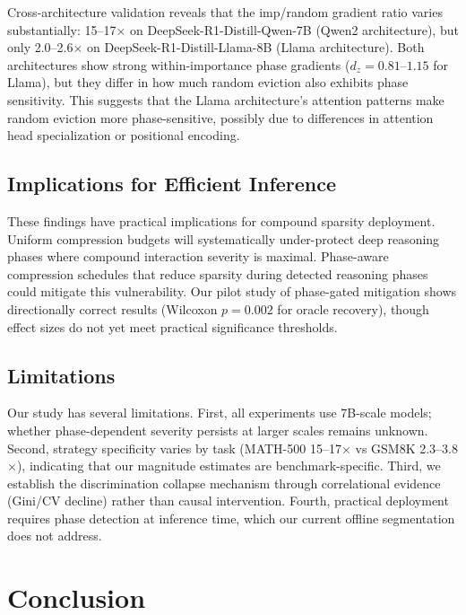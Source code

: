\documentclass[11pt,a4paper]{article}
\begin{document}
Cross-architecture validation reveals that the imp/random gradient ratio varies substantially: 15--17$\times$ on DeepSeek-R1-Distill-Qwen-7B (Qwen2 architecture), but only 2.0--2.6$\times$ on DeepSeek-R1-Distill-Llama-8B (Llama architecture). Both architectures show strong within-importance phase gradients ($d_z = 0.81$--$1.15$ for Llama), but they differ in how much random eviction also exhibits phase sensitivity. This suggests that the Llama architecture's attention patterns make random eviction more phase-sensitive, possibly due to differences in attention head specialization or positional encoding.

\subsection{Implications for Efficient Inference}

These findings have practical implications for compound sparsity deployment. Uniform compression budgets will systematically under-protect deep reasoning phases where compound interaction severity is maximal. Phase-aware compression schedules that reduce sparsity during detected reasoning phases could mitigate this vulnerability. Our pilot study of phase-gated mitigation shows directionally correct results (Wilcoxon $p = 0.002$ for oracle recovery), though effect sizes do not yet meet practical significance thresholds.

\subsection{Limitations}

Our study has several limitations. First, all experiments use 7B-scale models; whether phase-dependent severity persists at larger scales remains unknown. Second, strategy specificity varies by task (MATH-500 15--17$\times$ vs GSM8K 2.3--3.8$\times$), indicating that our magnitude estimates are benchmark-specific. Third, we establish the discrimination collapse mechanism through correlational evidence (Gini/CV decline) rather than causal intervention. Fourth, practical deployment requires phase detection at inference time, which our current offline segmentation does not address.

\section{Conclusion}
\end{document}
